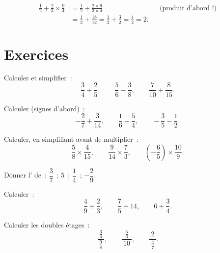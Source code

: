 \begin{example}\label{ex:g8:fractions:mixed}
\begin{align*}
\frac12 + \frac{2}{3} \times \frac{9}{4}
&= \frac12 + \frac{2 \times 9}{3 \times 4}
&& \text{(produit d'abord~!)} \\
&= \frac12 + \frac{18}{12} = \frac12 + \frac32
= \frac{4}{2} = 2 .
\end{align*}
\end{example}

\section{Exercices}

\begin{exercise}[$\star$]\label{exo:g8:fractions:1}
Calculer et simplifier~:
\[
\frac{3}{4} + \frac{2}{5}, \qquad
\frac{5}{6} - \frac{3}{8}, \qquad
\frac{7}{10} + \frac{8}{15} .
\]
\end{exercise}

\begin{exercise}[$\star$]\label{exo:g8:fractions:2}
Calculer (signes d'abord)~:
\[
-\frac{2}{7} + \frac{3}{14}, \qquad
\frac{1}{6} - \frac{5}{4}, \qquad
-\frac{3}{5} - \frac{1}{2} .
\]
\end{exercise}

\begin{exercise}[$\star$]\label{exo:g8:fractions:3}
Calculer, en simplifiant avant de multiplier~:
\[
\frac{5}{8} \times \frac{4}{15}, \qquad
\frac{9}{14} \times \frac{7}{3}, \qquad
\left(-\frac{6}{5}\right) \times \frac{10}{9} .
\]
\end{exercise}

\begin{exercise}[$\star$]\label{exo:g8:fractions:4}
Donner l' de~: $\dfrac{3}{7}$~; \quad $5$~; \quad
$\dfrac{1}{4}$~; \quad $-\dfrac{2}{9}$.
\end{exercise}

\begin{exercise}[$\star$]\label{exo:g8:fractions:5}
Calculer~:
\[
\frac{4}{9} \div \frac{2}{3}, \qquad
\frac{7}{5} \div 14, \qquad
6 \div \frac{3}{4} .
\]
\end{exercise}

\begin{exercise}[$\star$]\label{exo:g8:fractions:6}
Calculer les doubles étages~:
\[
\frac{\ \frac{3}{4}\ }{\ \frac{9}{8}\ },
\qquad
\frac{\ \frac{5}{6}\ }{\ 10\ },
\qquad
\frac{\ 2\ }{\ \frac{4}{7}\ } .
\]
\end{exercise}

